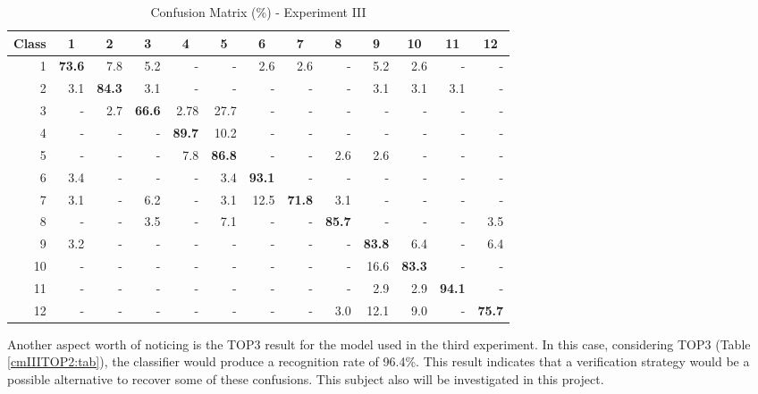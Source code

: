 \documentclass{article}[14pt, oneside, a4paper, times]
\begin{document}
\begin{table} [ht!]
\caption {Confusion Matrix (\%) - Experiment III}
\begin{center}
\begin{tabular}{rrrrrrrrrrrrr} \hline 
 \multicolumn{1}{c}{Class}&
 \multicolumn{1}{c}{1}&
 \multicolumn{1}{c}{2}&
 \multicolumn{1}{c}{3}&
 \multicolumn{1}{c}{4}&
 \multicolumn{1}{c}{5}&
 \multicolumn{1}{c}{6}&
 \multicolumn{1}{c}{7}&
 \multicolumn{1}{c}{8}&
 \multicolumn{1}{c}{9}&
 \multicolumn{1}{c}{10}&
 \multicolumn{1}{c}{11}&
 \multicolumn{1}{c}{12} \\ \hline

1 & \textbf{73.6} 	& 7.8 	& 5.2 	& -   	& -   	& 2.6 	& 2.6 	& -   	& 5.2 	& 2.6 	& -   	& -   \\
2 & 3.1 	& \textbf{84.3} 	& 3.1 	& -   	& -   	& -   	& -   	& -   	& 3.1 	& 3.1 	& 3.1	& -   \\
3 & -   	& 2.7 	& \textbf{66.6} 	& 2.78 	& 27.7 	& -   	& -   	& -   	& -   	& -   	& -   	& -   \\
4 & -   	& -   	& -   	& \textbf{89.7} 	& 10.2 	& -   	& -   	& -   	& -   	& -   	& -   	& -   \\
5 & -   	& -   	& -   	& 7.8 	& \textbf{86.8} 	& -   	& -   	& 2.6 	& 2.6 	& -   	& -   	& -   \\
6 & 3.4 	& -   	& -   	& -   	& 3.4 	& \textbf{93.1} 	& -   	& -   	& -   	& -   	& -   	& -   \\
7 & 3.1 	& -   	& 6.2 	& -   	& 3.1 	& 12.5 	& \textbf{71.8} 	& 3.1 	& -   	& -   	& -   	& -   \\
8 & -   	& -   	& 3.5 	& -   	& 7.1 	& -   	& -   	& \textbf{85.7} 	& -   	& -   	& -   	& 3.5 \\
9 & 3.2 	& -   	& -   	& -   	& -   	& -   	& -   	& -   	& \textbf{83.8} 	& 6.4 	& -   	& 6.4 \\
10&  -   & -   	& -   	& -   	& -   	& -   	& -   	& -   	& 16.6 	& \textbf{83.3} 	& -   	& -   \\
11&  -   & -   	& -   	& -   	& -   	& -   	& -   	& -   	& 2.9 	& 2.9 	& \textbf{94.1} 	& -   \\
12&  -   & -   	& -   	& -   	& -   	& -   	& -   	& 3.0 	& 12.1 	& 9.0 	& -   	& \textbf{75.7} \\ \hline

\end{tabular}
\label{cmIII:tab}
\end{center}
\end{table}

Another aspect worth of noticing is the TOP3 result for the model used in the third experiment. In this case, considering TOP3 (Table \ref{cmIIITOP2:tab}), the classifier would produce a recognition rate of 96.4\%. This result indicates that a verification strategy would be a possible alternative to recover some of these confusions. This subject also will be investigated in this project.
\end{document}
